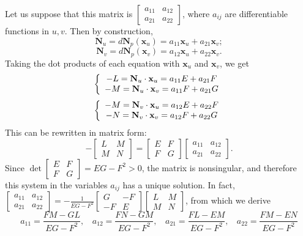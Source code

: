 \documentclass[leqno]{book}
\begin{document}
Let us suppose that this matrix is $\begin{bmatrix}a_{11}&a_{12}\\a_{21}&a_{22}\end{bmatrix}$, where $a_{ij}$ are differentiable functions in $u,v$.  Then by construction,
$$\mathbf N_u=d\mathbf N_p(\mathbf x_u)=a_{11}\mathbf x_u+a_{21}\mathbf x_v;$$
$$\mathbf N_v=d\mathbf N_p(\mathbf x_v)=a_{12}\mathbf x_u+a_{22}\mathbf x_v.$$
Taking the dot products of each equation with $\mathbf x_u$ and $\mathbf x_v$, we get
$$\left\{\begin{array}{c l}-L=\mathbf N_u\cdot\mathbf x_u=a_{11}E+a_{21}F\\-M=\mathbf N_u\cdot\mathbf x_v=a_{11}F+a_{21}G\end{array}\right.$$
$$\left\{\begin{array}{c l}-M=\mathbf N_v\cdot\mathbf x_u=a_{12}E+a_{22}F\\-N=\mathbf N_v\cdot\mathbf x_v=a_{12}F+a_{22}G\end{array}\right.$$
This can be rewritten in matrix form:
\begin{equation}\tag{*}-\begin{bmatrix}L&M\\M&N\end{bmatrix}=\begin{bmatrix}E&F\\F&G\end{bmatrix}\begin{bmatrix}a_{11}&a_{12}\\a_{21}&a_{22}\end{bmatrix}.\end{equation}
Since $\det\begin{bmatrix}E&F\\F&G\end{bmatrix}=EG-F^2>0$, the matrix is nonsingular, and therefore this system in the variables $a_{ij}$ has a unique solution.  In fact, $\begin{bmatrix}a_{11}&a_{12}\\a_{21}&a_{22}\end{bmatrix}=-\frac 1{EG-F^2}\begin{bmatrix}G&-F\\-F&E\end{bmatrix}\begin{bmatrix}L&M\\M&N\end{bmatrix}$, from which we derive
$$a_{11}=\frac{FM-GL}{EG-F^2},~~~~a_{12}=\frac{FN-GM}{EG-F^2},~~~~a_{21}=\frac{FL-EM}{EG-F^2},~~~~a_{22}=\frac{FM-EN}{EG-F^2}$$
\end{document}
